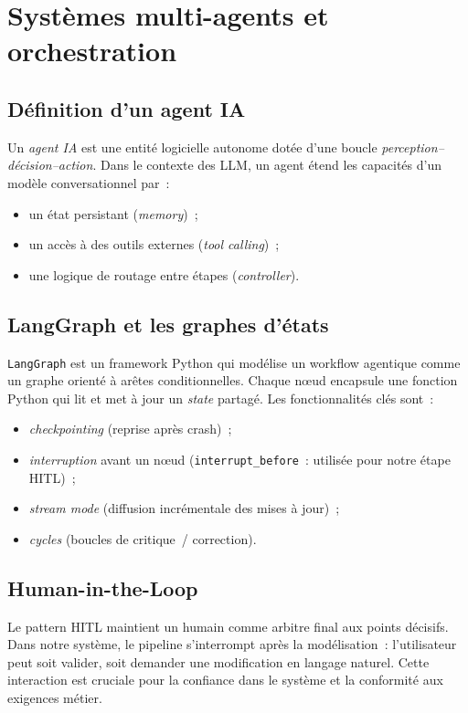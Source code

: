 \documentclass[12pt, a4paper]{report}
\begin{document}
\section{Systèmes multi-agents et orchestration}

\subsection{Définition d'un agent IA}
Un \emph{agent IA} est une entité logicielle autonome dotée d'une boucle
\emph{perception--décision--action}. Dans le contexte des \ac{LLM}, un
agent étend les capacités d'un modèle conversationnel par~:
\begin{itemize}
  \item un état persistant (\emph{memory})~;
  \item un accès à des outils externes (\emph{tool calling})~;
  \item une logique de routage entre étapes (\emph{controller}).
\end{itemize}

\subsection{LangGraph et les graphes d'états}
\texttt{LangGraph} est un framework Python qui modélise un workflow
agentique comme un graphe orienté à arêtes conditionnelles. Chaque
nœud encapsule une fonction Python qui lit et met à jour un \emph{state}
partagé. Les fonctionnalités clés sont~:
\begin{itemize}
  \item \emph{checkpointing} (reprise après crash)~;
  \item \emph{interruption} avant un nœud
        (\texttt{interrupt\_before}~: utilisée pour notre étape
        \ac{HITL})~;
  \item \emph{stream mode} (diffusion incrémentale des mises à jour)~;
  \item \emph{cycles} (boucles de critique~/ correction).
\end{itemize}

\subsection{Human-in-the-Loop}
Le pattern \ac{HITL} maintient un humain comme arbitre final aux
points décisifs. Dans notre système, le pipeline s'interrompt après
la modélisation~: l'utilisateur peut soit valider, soit demander une
modification en langage naturel. Cette interaction est cruciale pour
la confiance dans le système et la conformité aux exigences métier.
\end{document}
